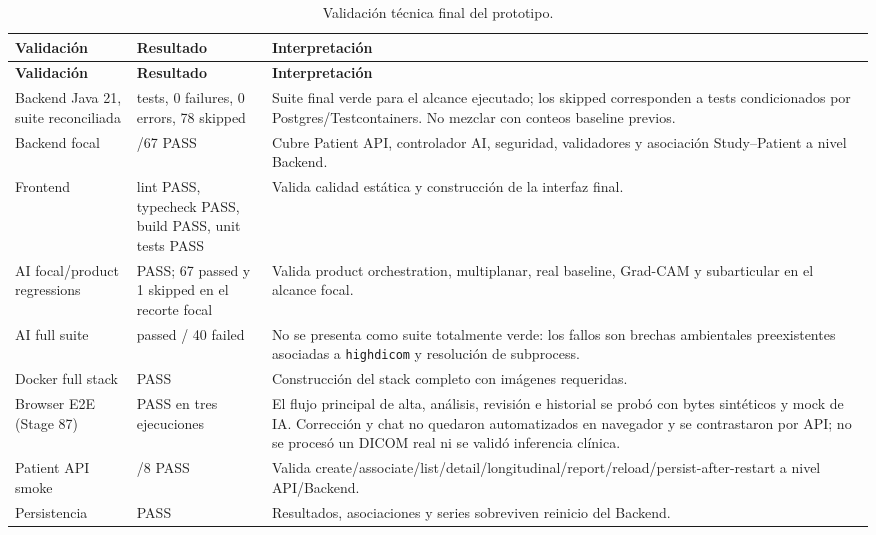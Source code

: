 {\scriptsize
\setlength{\LTleft}{0pt}
\setlength{\LTright}{0pt}
\setlength{\tabcolsep}{3pt}
\renewcommand{\arraystretch}{1.18}
\begin{longtable}{>{\raggedright\arraybackslash}p{} >{\raggedright\arraybackslash}p{} >{\raggedright\arraybackslash}p{}}\caption{Validación técnica final del prototipo.}\label{tab:res-validacion-tecnica-final}\\
\hline
\textbf{Validación} & \textbf{Resultado} & \textbf{Interpretación} \\
\hline
\endfirsthead
\hline
\textbf{Validación} & \textbf{Resultado} & \textbf{Interpretación} \\
\hline
\endhead
\hline
\endfoot
Backend Java 21, suite reconciliada & 1053 tests, 0 failures, 0 errors, 78 skipped & Suite final verde para el alcance ejecutado; los skipped corresponden a tests condicionados por Postgres/Testcontainers. No mezclar con conteos baseline previos. \\
Backend focal & 67/67 PASS & Cubre Patient API, controlador AI, seguridad, validadores y asociación Study--Patient a nivel Backend. \\
Frontend & lint PASS, typecheck PASS, build PASS, unit tests PASS & Valida calidad estática y construcción de la interfaz final. \\
AI focal/product regressions & PASS; 67 passed y 1 skipped en el recorte focal & Valida product orchestration, multiplanar, real baseline, Grad-CAM y subarticular en el alcance focal. \\
AI full suite & 479 passed / 40 failed & No se presenta como suite totalmente verde: los fallos son brechas ambientales preexistentes asociadas a \texttt{highdicom} y resolución de subprocess. \\
Docker full stack & PASS & Construcción del stack completo con imágenes requeridas. \\
Browser E2E (Stage 87) & PASS en tres ejecuciones & El flujo principal de alta, análisis, revisión e historial se probó con bytes sintéticos y mock de IA. Corrección y chat no quedaron automatizados en navegador y se contrastaron por API; no se procesó un DICOM real ni se validó inferencia clínica. \\
Patient API smoke & 8/8 PASS & Valida create/associate/list/detail/longitudinal/report/reload/persist-after-restart a nivel API/Backend. \\
Persistencia & PASS & Resultados, asociaciones y series sobreviven reinicio del Backend. \\

\end{longtable}}
